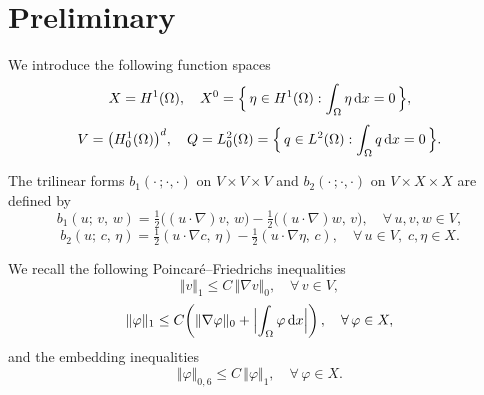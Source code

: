 %
%
%

\section{Preliminary}
\label{sec:preliminary}

We introduce the following function spaces
\begin{equation}
  X = H^{1}(\Omega),\quad
  X^{0} = \Bigl\{\,\eta\in H^{1}(\Omega) : \int_{\Omega}\eta\,\mathrm{d}x = 0\,\Bigr\},
  \label{eq:X-space}
\end{equation}
\begin{equation}
  V = \bigl(H^{1}_{0}(\Omega)\bigr)^{d},\quad
  Q = L^{2}_{0}(\Omega) = \Bigl\{\,q\in L^{2}(\Omega) : \int_{\Omega}q\,\mathrm{d}x = 0\,\Bigr\}.
  \label{eq:VQ-space}
\end{equation}

The trilinear forms $b_{1}(\cdot\,;\cdot,\cdot)$ on $V\times V\times V$ and
$b_{2}(\cdot\,;\cdot,\cdot)$ on $V\times X\times X$ are defined by
\begin{equation}
  b_{1}(u;\,v,\,w)
  = \tfrac{1}{2}\bigl((u\cdot\nabla)v,\,w\bigr)
  - \tfrac{1}{2}\bigl((u\cdot\nabla)w,\,v\bigr),
  \quad \forall\,u,v,w\in V,
  \label{eq:b1}
\end{equation}
\begin{equation}
  b_{2}(u;\,c,\,\eta)
  = \tfrac{1}{2}(u\cdot\nabla c,\,\eta)
  - \tfrac{1}{2}(u\cdot\nabla\eta,\,c),
  \quad \forall\,u\in V,\;c,\eta\in X.
  \label{eq:b2}
\end{equation}

We recall the following Poincar\'{e}--Friedrichs inequalities
\begin{equation}
  \Vert v\Vert_{1} \le C\,\Vert\nabla v\Vert_{0},
  \quad \forall\,v\in V,
  \label{eq:PF1}
\end{equation}
\begin{equation}
  \Vert\varphi\Vert_{1}
  \le C\!\left(\Vert\nabla\varphi\Vert_{0}
    + \Bigl|\int_{\Omega}\varphi\,\mathrm{d}x\Bigr|\right),
  \quad \forall\,\varphi\in X,
  \label{eq:PF2}
\end{equation}
and the embedding inequalities
\begin{equation}
  \Vert\varphi\Vert_{0,6} \le C\,\Vert\varphi\Vert_{1},
  \quad \forall\,\varphi\in X.
  \label{eq:embed}
\end{equation}

